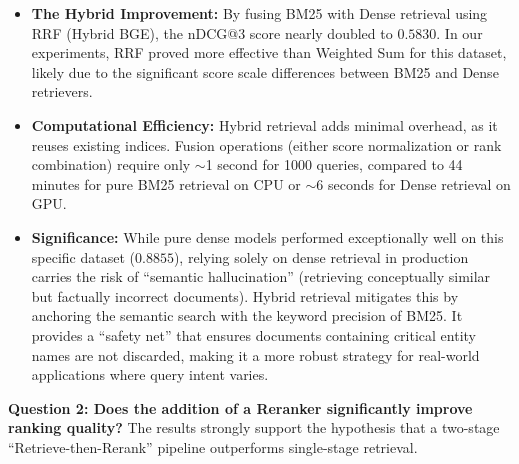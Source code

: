 \begin{itemize}
\begin{enumerate}
        \[\text{RRF}(d) = \dfrac{1}{k + \text{rank}_{\text{dense}}(d)} + \dfrac{1}{k + \text{rank}_{\text{bm25}}(d)},\] 
        
        where $k=60$ is a damping constant. RRF is extremely stable and immune to score scale differences, making it a robust choice when score calibration is uncertain. However, it discards confidence information encoded in the raw scores.
    \end{enumerate}
    \item \textbf{The Hybrid Improvement:} By fusing BM25 with Dense retrieval using RRF (Hybrid BGE), the nDCG@3 score nearly doubled to $0.5830$. In our experiments, RRF proved more effective than Weighted Sum for this dataset, likely due to the significant score scale differences between BM25 and Dense retrievers.
    \item \textbf{Computational Efficiency:} Hybrid retrieval adds minimal overhead, as it reuses existing indices. Fusion operations (either score normalization or rank combination) require only $\sim$1 second for 1000 queries, compared to 44 minutes for pure BM25 retrieval on CPU or $\sim$6 seconds for Dense retrieval on GPU.
    \item \textbf{Significance:} While pure dense models performed exceptionally well on this specific dataset ($0.8855$), relying solely on dense retrieval in production carries the risk of ``semantic hallucination'' (retrieving conceptually similar but factually incorrect documents). Hybrid retrieval mitigates this by anchoring the semantic search with the keyword precision of BM25. It provides a ``safety net'' that ensures documents containing critical entity names are not discarded, making it a more robust strategy for real-world applications where query intent varies.
\end{itemize}

\textbf{Question 2: Does the addition of a Reranker significantly improve ranking quality?}
The results strongly support the hypothesis that a two-stage ``Retrieve-then-Rerank'' pipeline outperforms single-stage retrieval.

